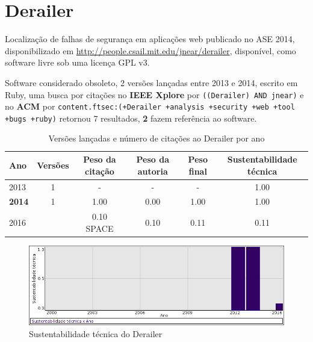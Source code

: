 \section{Derailer}

Localização de falhas de segurança em aplicações web
publicado no ASE 2014,
disponibilizado em \url{http://people.csail.mit.edu/jnear/derailer},
disponível,
como software livre
sob uma licença GPL v3.

Software considerado obsoleto,
2 versões lançadas
entre 2013 e 2014,
escrito em Ruby,
uma busca por citações no {\bf IEEE Xplore} por
\texttt{((Derailer) AND jnear)}
e no {\bf ACM} por
\texttt{content.ftsec:(+Derailer +analysis +security +web +tool +bugs +ruby)}
retornou
7 resultados,
{\bf 2} fazem referência ao software.


\begin{table}[H]
\caption{Versões lançadas e número de citações ao Derailer por ano}
\centering
\begin{tabular}{| l | c | c | c | c | c |}
  \hline
  Ano & Versões & Peso da citação & Peso da autoria & Peso final & Sustentabilidade técnica \\
  \hline
        2013 & 1 & - & - & -
        &
          {\color{blue} 1.00}
        \\
\hline
            {\bf 2014}
          &
          1
          &
          1.00
          &
          0.00
          &
          1.00
          &
            {\color{blue} 1.00}
          \\
\hline
            2016
          &
          
          &
          0.10
            {\tiny SPACE}
          &
          0.10
          &
          0.11
          &
            {\color{red} 0.11}
          \\
\hline
\end{tabular}
\end{table}

\begin{figure}[h]
  \center
  \includegraphics[scale=0.50]{result-documents/charts/derailer.png}
  \caption{Sustentabilidade técnica do Derailer}
\end{figure}


